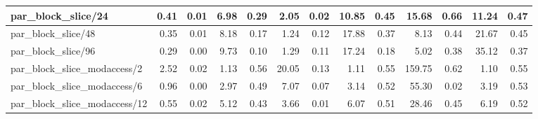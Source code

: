 \begin{tabular}{|lllllllllllll|}
\multicolumn{1}{|l|}{par\_block\_slice/24}  & \multicolumn{1}{r|}{0.41} & \multicolumn{1}{r|}{0.01} & \multicolumn{1}{r|}{6.98} & \multicolumn{1}{r|}{0.29}  & \multicolumn{1}{r|}{2.05} & \multicolumn{1}{r|}{0.02} & \multicolumn{1}{r|}{10.85} & \multicolumn{1}{r|}{0.45}  & \multicolumn{1}{r|}{15.68} & \multicolumn{1}{r|}{0.66} & \multicolumn{1}{r|}{11.24} & \multicolumn{1}{r|}{0.47}  \\ \hline
\multicolumn{1}{|l|}{par\_block\_slice/48}  & \multicolumn{1}{r|}{0.35} & \multicolumn{1}{r|}{0.01} & \multicolumn{1}{r|}{8.18} & \multicolumn{1}{r|}{0.17}  & \multicolumn{1}{r|}{1.24} & \multicolumn{1}{r|}{0.12} & \multicolumn{1}{r|}{17.88} & \multicolumn{1}{r|}{0.37}  & \multicolumn{1}{r|}{8.13} & \multicolumn{1}{r|}{0.44} & \multicolumn{1}{r|}{21.67} & \multicolumn{1}{r|}{0.45}  \\ \hline
\multicolumn{1}{|l|}{par\_block\_slice/96}  & \multicolumn{1}{r|}{0.29} & \multicolumn{1}{r|}{0.00} & \multicolumn{1}{r|}{9.73} & \multicolumn{1}{r|}{0.10}  & \multicolumn{1}{r|}{1.29} & \multicolumn{1}{r|}{0.11} & \multicolumn{1}{r|}{17.24} & \multicolumn{1}{r|}{0.18}  & \multicolumn{1}{r|}{5.02} & \multicolumn{1}{r|}{0.38} & \multicolumn{1}{r|}{35.12} & \multicolumn{1}{r|}{0.37}  \\ \hline
\multicolumn{1}{|l|}{par\_block\_slice\_modaccess/2}  & \multicolumn{1}{r|}{2.52} & \multicolumn{1}{r|}{0.02} & \multicolumn{1}{r|}{1.13} & \multicolumn{1}{r|}{0.56}  & \multicolumn{1}{r|}{20.05} & \multicolumn{1}{r|}{0.13} & \multicolumn{1}{r|}{1.11} & \multicolumn{1}{r|}{0.55}  & \multicolumn{1}{r|}{159.75} & \multicolumn{1}{r|}{0.62} & \multicolumn{1}{r|}{1.10} & \multicolumn{1}{r|}{0.55}  \\ \hline
\multicolumn{1}{|l|}{par\_block\_slice\_modaccess/6}  & \multicolumn{1}{r|}{0.96} & \multicolumn{1}{r|}{0.00} & \multicolumn{1}{r|}{2.97} & \multicolumn{1}{r|}{0.49}  & \multicolumn{1}{r|}{7.07} & \multicolumn{1}{r|}{0.07} & \multicolumn{1}{r|}{3.14} & \multicolumn{1}{r|}{0.52}  & \multicolumn{1}{r|}{55.30} & \multicolumn{1}{r|}{0.02} & \multicolumn{1}{r|}{3.19} & \multicolumn{1}{r|}{0.53}  \\ \hline
\multicolumn{1}{|l|}{par\_block\_slice\_modaccess/12}  & \multicolumn{1}{r|}{0.55} & \multicolumn{1}{r|}{0.02} & \multicolumn{1}{r|}{5.12} & \multicolumn{1}{r|}{0.43}  & \multicolumn{1}{r|}{3.66} & \multicolumn{1}{r|}{0.01} & \multicolumn{1}{r|}{6.07} & \multicolumn{1}{r|}{0.51}  & \multicolumn{1}{r|}{28.46} & \multicolumn{1}{r|}{0.45} & \multicolumn{1}{r|}{6.19} & \multicolumn{1}{r|}{0.52}  \\ \hline

\end{tabular}
